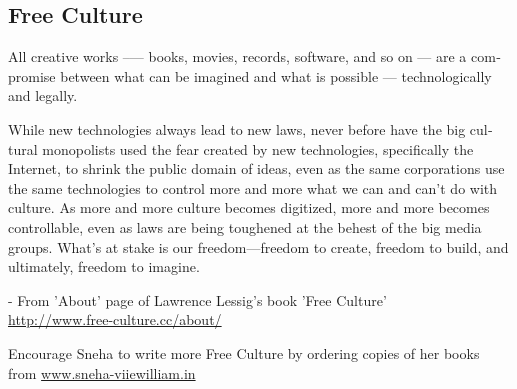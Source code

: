 \newpage
\begin{english}
\section*{Free Culture}
All creative works --— books, movies, records, software, and so on --- are a compromise between what can be imagined and what is possible --- technologically and legally.

While new technologies always lead to new laws, never before have the big cultural monopolists used the fear created by new technologies, specifically the Internet, to shrink the public domain of ideas, even as the same corporations use the same technologies to control more and more what we can and can’t do with culture. As more and more culture becomes digitized, more and more becomes controllable, even as laws are being toughened at the behest of the big media groups. What’s at stake is our freedom—freedom to create, freedom to build, and ultimately, freedom to imagine.
\begin{flushright}- From 'About' page of Lawrence Lessig's book 'Free Culture'\\
\url{http://www.free-culture.cc/about/}\end{flushright}

Encourage Sneha to write more Free Culture by ordering copies of her books from \url{www.sneha-viiewilliam.in}
\end{english}
